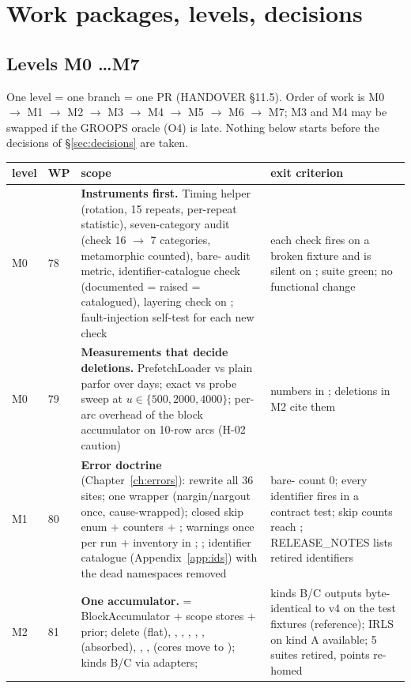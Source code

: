 \chapter{Work packages, levels, decisions}
\label{ch:plan}

\section{Levels M0 \ldots M7}

One level = one branch = one PR (HANDOVER §11.5). Order of work is M0 $\to$ M1 $\to$ M2 $\to$ M3 $\to$ M4 $\to$ M5 $\to$ M6 $\to$ M7; M3 and M4 may be swapped if the GROOPS oracle (O4) is late. Nothing below starts before the decisions of \S\ref{sec:decisions} are taken.

\begin{longtable}{@{}P{9mm}P{9mm}P{86mm}P{50mm}@{}}
\toprule
level & WP & scope & exit criterion\\
\midrule
M0 & 78 & \textbf{Instruments first.} Timing helper (rotation, 15 repeats, per-repeat statistic), seven-category audit (check 16 $\to$ 7 categories, metamorphic counted), bare- audit metric, identifier-catalogue check (documented = raised = catalogued), layering check on ; fault-injection self-test for each new check & each check fires on a broken fixture and is silent on ; suite green; no functional change\\
M0 & 79 & \textbf{Measurements that decide deletions.} PrefetchLoader vs plain parfor over days; exact vs probe sweep at $u \in \{500, 2000, 4000\}$; per-arc overhead of the block accumulator on 10-row arcs (H-02 caution) & numbers in ; deletions in M2 cite them\\
\midrule
M1 & 80 & \textbf{Error doctrine} (Chapter~\ref{ch:errors}): rewrite all 36  sites; one  wrapper (nargin/nargout once, cause-wrapped); closed skip enum + counters + ; warnings once per run + inventory in ; ; identifier catalogue (Appendix~\ref{app:ids}) with the dead namespaces removed & bare- count 0; every identifier fires in a contract test; skip counts reach ; RELEASE\_NOTES lists retired identifiers\\
\midrule
M2 & 81 & \textbf{One accumulator.}  = BlockAccumulator + scope stores + prior; delete  (flat), , , , , ,  (absorbed), , ,  (cores move to ); kinds B/C via  adapters;  & kinds B/C outputs byte-identical to v4 on the test fixtures (reference); IRLS on kind A available; 5 suites retired, points re-homed\\

\end{longtable}
